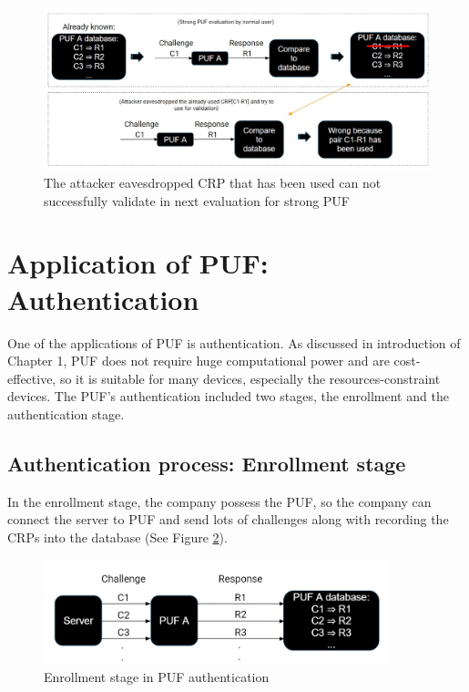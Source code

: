 \begin{figure}[htp]
    \centering
    \includegraphics[width=16cm]{figures/figure3.jpg}
    \caption{The attacker eavesdropped CRP that has been used can not successfully validate in next evaluation for strong PUF}
    \label{fig:figure3}
    \end{figure}

\section{Application of PUF: Authentication}
One of the applications of PUF is authentication. As discussed in introduction of Chapter 1, PUF does not require huge computational power and are cost-effective, so it is suitable for many devices,
especially the resources-constraint devices. The PUF's authentication included two stages, the enrollment and the authentication stage. 

\subsection{Authentication process: Enrollment stage}
In the enrollment stage, the company possess the PUF, so
the company can connect the server to PUF and send lots of challenges along with recording the CRPs into the database \cite{Reference2} (See Figure \ref{fig:figure4}).

\begin{figure}[htp]
    \centering
    \includegraphics[width=10cm]{figures/figure4.jpg}
    \caption{Enrollment stage in PUF authentication}
    \label{fig:figure4}
    \end{figure}

